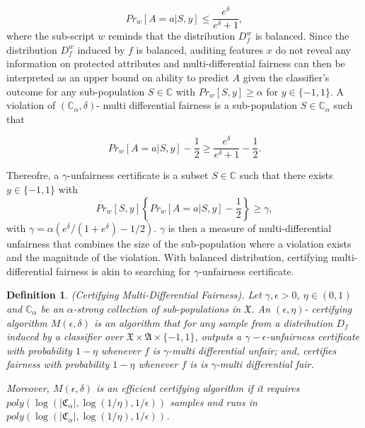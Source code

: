 \documentclass{article}
\newtheorem{defn}{Definition}[section]
\begin{document}
\begin{equation}
    \label{eq: mdf_w}
    Pr_{w}[A=a |S, y] \leq \frac{e^{\delta}}{e^{\delta} + 1},
\end{equation}
where the sub-script $w$ reminds that the distribution $D_{f}^{w}$ is balanced. Since the distribution $D_{f}^{w}$ induced by $f$ is balanced, auditing features $x$ do not reveal any information on protected attributes and multi-differential fairness can then be interpreted as an upper bound on ability to predict $A$ given the classifier's outcome for any sub-population $S\in \mathbb{C}$ with $Pr_{w}[S, y] \geq \alpha$ for $y\in\{-1, 1\}$.  A violation of $(\mathbb{C}_{\alpha}, \delta)$- multi differential fairness is a sub-population $S\in \mathbb{C}_{\alpha}$ such that 

\begin{equation}
    \label{eq: mdf_viol1}
    Pr_{w}[A=a |S, y] - \frac{1}{2}\geq \frac{e^{\delta}}{e^{\delta} + 1} - \frac{1}{2}. 
\end{equation}

Thereofre, a $\gamma$-unfairness certificate is a subset $S\in \mathbb{C}$ such that there exists $y\in \{-1, 1\}$ with
\begin{equation}
    Pr_{w}[S, y]\left\{Pr_{w}[A=a |S, y] -\frac{1}{2}\right\}\geq \gamma,
\end{equation}
with $\gamma =\alpha \left(e^{\delta}/(1+e^{\delta})-1/2\right)$. $\gamma$ is then a measure of multi-differential unfairness that combines the size of the sub-population where a violation exists and the magnitude of the violation. With balanced distribution, certifying multi-differential fairness is akin to searching for $\gamma$-unfairness certificate. 

\begin{defn}(Certifying Multi-Differential Fairness). 
Let $\gamma, \epsilon >0$, $\eta\in (0, 1)$ and $\mathbb{C}_{\alpha}$ be an $\alpha$-strong collection of sub-populations in $\mathfrak{X}$. An $(\epsilon, \eta)$- certifying algorithm $M(\epsilon, \delta)$ is an algorithm that for any sample from a distribution $D_{f}$ induced by a classifier over $\mathfrak{X} \times \mathfrak{A}\times \{-1, 1\}$, outputs a $\gamma-\epsilon$-unfairness certificate with probability $1-\eta$ whenever $f$ is $ \gamma$-multi differential unfair; and, certifies fairness with probability $1-\eta$ whenever $f$ is is $\gamma$-multi differential fair. 

\bigskip
Moreover, $M(\epsilon, \delta)$ is an efficient certifying algorithm if it requires $poly(\log(|\mathfrak{C}_{\alpha}|, \log(1/\eta), 1/\epsilon))$ samples and runs in $poly(\log(|\mathfrak{C}_{\alpha}|, \log(1/\eta), 1/\epsilon))$. 
\end{defn}
\end{document}
